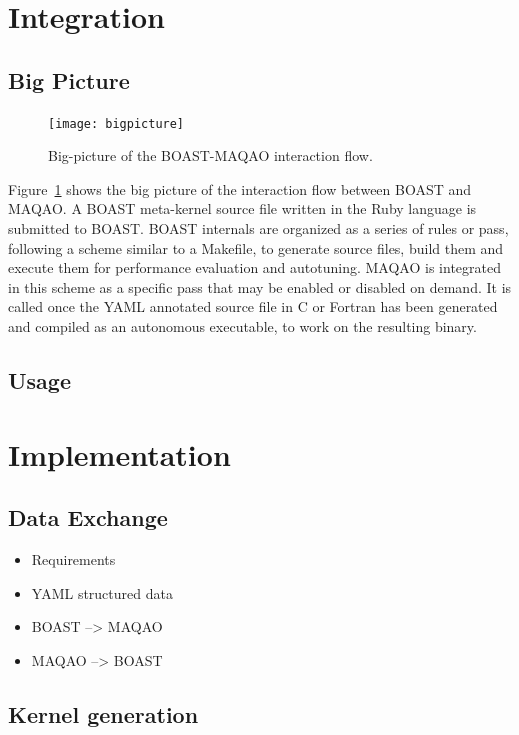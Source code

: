\documentclass[11pt, a4paper, twoside]{montblanc2}
\begin{document}
\section{Integration}

  \subsection{Big Picture}
\begin{figure}[h]
  \centering
\texttt{[image: bigpicture]}
\caption{Big-picture of the BOAST-MAQAO interaction flow.}\label{fig:bigpict}
\end{figure}

Figure~\ref{fig:bigpict} shows the big picture of the interaction flow between BOAST and MAQAO. A 
BOAST meta-kernel source file written in the Ruby language is submitted to BOAST. BOAST internals 
are organized as a series of rules or pass, following a scheme similar to a Makefile, to generate 
source files, build them and execute them for performance evaluation and autotuning. MAQAO is 
integrated in this scheme as a specific pass that may be enabled or disabled on demand. It is called 
once the YAML annotated source file in C or Fortran has been generated and compiled as an autonomous 
executable, to work on the resulting binary.

  \subsection{Usage}

\section{Implementation}

\subsection{Data Exchange}

\begin{itemize}
  \item Requirements
  \item YAML structured data
  \item BOAST --> MAQAO
  \item MAQAO --> BOAST
\end{itemize}

\subsection{Kernel generation}
\end{document}
